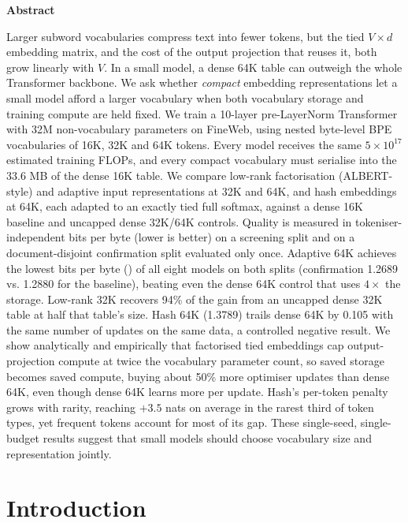 \documentclass[10pt,a4paper]{article}
\newcommand{\bpb}{\text{BPB}}
\begin{document}
\begin{center}
{\large\bfseries Abstract}
\end{center}
\vspace{-4pt}
\noindent
Larger subword vocabularies compress text into fewer tokens, but the tied $V\times d$ embedding matrix, and the cost of the output projection that reuses it, both grow linearly with $V$.
In a small model, a dense 64K table can outweigh the whole Transformer backbone.
We ask whether \emph{compact} embedding representations let a small model afford a larger vocabulary when both vocabulary storage and training compute are held fixed.
We train a 10-layer pre-LayerNorm Transformer with 32M non-vocabulary parameters on FineWeb, using nested byte-level BPE vocabularies of 16K, 32K and 64K tokens.
Every model receives the same $5\times10^{17}$ estimated training FLOPs, and every compact vocabulary must serialise into the 33.6 MB of the dense 16K table.
We compare low-rank factorisation (ALBERT-style) and adaptive input representations at 32K and 64K, and hash embeddings at 64K, each adapted to an exactly tied full softmax, against a dense 16K baseline and uncapped dense 32K/64K controls.
Quality is measured in tokeniser-independent bits per byte (lower is better) on a screening split and on a document-disjoint confirmation split evaluated only once.
Adaptive 64K achieves the lowest bits per byte (\bpb{}) of all eight models on both splits (confirmation 1.2689 vs. 1.2880 for the baseline), beating even
the dense 64K control that uses $4\times$ the storage. Low-rank 32K recovers 94\% of the gain from an uncapped dense 32K table at half that table’s size.
Hash 64K (1.3789) trails dense 64K by 0.105 \bpb{} with the same number of updates on the same data, a controlled negative result. We show analytically and empirically that factorised tied embeddings cap output-projection compute at twice the vocabulary parameter count, so saved storage becomes saved compute, buying about 50\% more optimiser updates than dense 64K, even though dense 64K learns more per update.
Hash's per-token penalty grows with rarity, reaching $+3.5$ nats on average in the rarest
third of token types, yet frequent tokens account for most of its \bpb{} gap. These
single-seed, single-budget results suggest that small models should choose vocabulary size and
representation jointly.

\section{Introduction}
\label{sec:intro}
\end{document}
